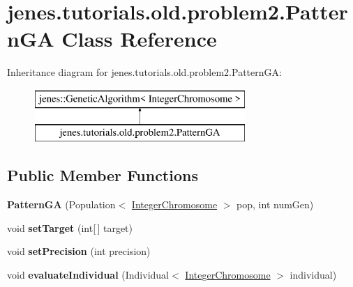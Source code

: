 \hypertarget{classjenes_1_1tutorials_1_1old_1_1problem2_1_1_pattern_g_a}{\section{jenes.\-tutorials.\-old.\-problem2.\-Pattern\-G\-A Class Reference}
\label{classjenes_1_1tutorials_1_1old_1_1problem2_1_1_pattern_g_a}
}
Inheritance diagram for jenes.\-tutorials.\-old.\-problem2.\-Pattern\-G\-A\-:\begin{figure}[H]
\begin{center}
\leavevmode
\includegraphics[height=2.000000cm]{classjenes_1_1tutorials_1_1old_1_1problem2_1_1_pattern_g_a}
\end{center}
\end{figure}
\subsection*{Public Member Functions}
\begin{DoxyCompactItemize}
\item 
\hypertarget{classjenes_1_1tutorials_1_1old_1_1problem2_1_1_pattern_g_a_a6c739b7abe3809978e5a2e8a41788eae}{{\bfseries Pattern\-G\-A} (Population$<$ \hyperlink{classjenes_1_1chromosome_1_1_integer_chromosome}{Integer\-Chromosome} $>$ pop, int num\-Gen)}\label{classjenes_1_1tutorials_1_1old_1_1problem2_1_1_pattern_g_a_a6c739b7abe3809978e5a2e8a41788eae}

\item 
\hypertarget{classjenes_1_1tutorials_1_1old_1_1problem2_1_1_pattern_g_a_acad7ad7941fbcf7fc8d555d0218886e1}{void {\bfseries set\-Target} (int\mbox{[}$\,$\mbox{]} target)}\label{classjenes_1_1tutorials_1_1old_1_1problem2_1_1_pattern_g_a_acad7ad7941fbcf7fc8d555d0218886e1}

\item 
\hypertarget{classjenes_1_1tutorials_1_1old_1_1problem2_1_1_pattern_g_a_a7d2561b481b6d1f87e6a5c8f602510b0}{void {\bfseries set\-Precision} (int precision)}\label{classjenes_1_1tutorials_1_1old_1_1problem2_1_1_pattern_g_a_a7d2561b481b6d1f87e6a5c8f602510b0}

\item 
\hypertarget{classjenes_1_1tutorials_1_1old_1_1problem2_1_1_pattern_g_a_a90edfd135e58f9a43e3722d9e1df6f95}{void {\bfseries evaluate\-Individual} (Individual$<$ \hyperlink{classjenes_1_1chromosome_1_1_integer_chromosome}{Integer\-Chromosome} $>$ individual)}\label{classjenes_1_1tutorials_1_1old_1_1problem2_1_1_pattern_g_a_a90edfd135e58f9a43e3722d9e1df6f95}

\end{DoxyCompactItemize}
